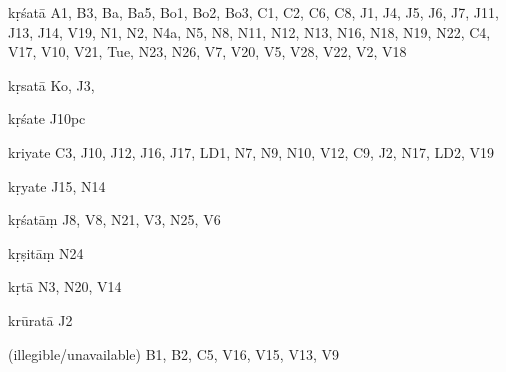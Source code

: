\begin{ekdosis}
\begin{marma}[hp01_055]
\begin{marma}[hp02_009]
\begin{marma}[hp02_011]
\begin{marma}[hp02_012]
\begin{description}
        \end{description}
\end{marma}

\begin{marma}[hp02_019]
\item[kṛśatā] A1, B3, Ba, Ba5, Bo1, Bo2, Bo3, C1, C2, C6, C8, J1, J4, J5, J6, J7, J11, J13, J14, V19, N1, N2, N4a, N5, N8, N11, N12, N13, N16, N18, N19, N22, C4, V17, V10, V21, Tue, N23, N26, V7, V20, V5, V28, V22, V2, V18
\item[kṛsatā] Ko, J3,  
\item[kṛśate] J10pc
\item[kriyate] C3, J10, J12, J16, J17, LD1, N7, N9, N10, V12, C9, J2, N17, LD2, V19
\item[kṛyate] J15, N14
\item[kṛśatāṃ] J8, V8, N21, V3, N25, V6
\item[kṛṣitāṃ] N24
\item[kṛtā] N3, N20, V14
\item[krūratā] J2
\item[(illegible/unavailable)]   B1, B2, C5, V16, V15, V13, V9
 \begin{description}

        \end{description}
\end{marma}


\end{marma}
\end{marma}
\end{marma}
\end{ekdosis}
